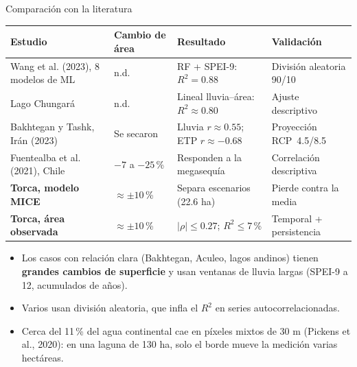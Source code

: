 \documentclass[10pt]{beamer}
\begin{document}
\begin{frame}{Comparación con la literatura}
\centering
\scriptsize
\setlength{\tabcolsep}{4pt}
\begin{tabular}{L{3.3cm}L{1.9cm}L{3.1cm}L{2.5cm}}
\toprule
Estudio & Cambio de área & Resultado & Validación \\
\midrule
Wang et al. (2023), 8 modelos de ML & n.d. & RF + SPEI-9: $R^2=0.88$ & División aleatoria 90/10 \\
Lago Chungará & n.d. & Lineal lluvia--área: $R^2\approx0.80$ & Ajuste descriptivo \\
Bakhtegan y Tashk, Irán (2023) & Se secaron & Lluvia $r\approx0.55$; ETP $r\approx-0.68$ & Proyección RCP~4.5/8.5 \\
Fuentealba et al. (2021), Chile & $-7$ a $-25$\,\% & Responden a la megasequía & Correlación descriptiva \\
\midrule
\textbf{Torca, modelo MICE} & ${\approx}\pm10$\,\% & Separa escenarios (22.6 ha) & Pierde contra la media \\
\textbf{Torca, área observada} & ${\approx}\pm10$\,\% & $|\rho|\le0.27$; $R^2\le7$\,\% & Temporal + persistencia \\
\bottomrule
\end{tabular}
\vspace{3mm}
\small
\begin{itemize}
\item Los casos con relación clara (Bakhtegan, Aculeo, lagos andinos) tienen \textbf{grandes cambios de superficie} y usan ventanas de lluvia largas (SPEI-9 a 12, acumulados de años).
\item Varios usan división aleatoria, que infla el $R^2$ en series autocorrelacionadas.
\item Cerca del 11\,\% del agua continental cae en píxeles mixtos de 30 m (Pickens et al., 2020): en una laguna de 130 ha, solo el borde mueve la medición varias hectáreas.
\end{itemize}
\end{frame}
\end{document}
